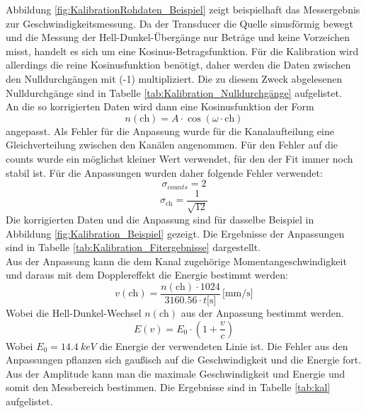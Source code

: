 \documentclass[12pt,a4paper]{article}
\begin{document}
Abbildung \ref{fig:KalibrationRohdaten_Beispiel} zeigt beispielhaft das Messergebnis zur Geschwindigkeitsmessung. Da der Transducer die Quelle sinusförmig bewegt und die Messung der Hell-Dunkel-Übergänge nur Beträge und keine Vorzeichen misst, handelt es sich um eine Kosinus-Betragsfunktion. Für die Kalibration wird allerdings die reine Kosinusfunktion benötigt, daher werden die Daten zwischen den Nulldurchgängen mit (-1) multipliziert. Die zu diesem Zweck abgelesenen Nulldurchgänge sind in Tabelle \ref{tab:Kalibration_Nulldurchgänge} aufgelistet. \\
An die so korrigierten Daten wird dann eine Kosinusfunktion der Form
\begin{equation*}
n(\textrm{ch}) = A \cdot \cos (\omega \cdot \textrm{ch})
\end{equation*}
angepasst. Als Fehler für die Anpassung wurde für die Kanalaufteilung eine Gleichverteilung zwischen den Kanälen angenommen. Für den Fehler auf die counts wurde ein möglichst kleiner Wert verwendet, für den der Fit immer noch stabil ist. Für die Anpassungen wurden daher folgende Fehler verwendet:
\begin{equation*}
\sigma _{counts} = 2
\end{equation*}
\begin{equation*}
\sigma _\textrm{ch} = \dfrac{1}{\sqrt{12}}
\end{equation*}
Die korrigierten Daten und die Anpassung sind für dasselbe Beispiel in Abbildung \ref{fig:Kalibration_Beispiel} gezeigt. Die Ergebnisse der Anpassungen sind in Tabelle \ref{tab:Kalibration_Fitergebnisse} dargestellt. \\
Aus der Anpassung kann die dem Kanal zugehörige Momentangeschwindigkeit und daraus mit dem Dopplereffekt die Energie bestimmt werden:
\begin{equation*}
v(\textrm{ch}) = \dfrac{n(\textrm{ch}) \cdot 1024}{3160.56 \cdot t \textrm{[s]}} \, \textrm{[mm/s]}
\end{equation*}
Wobei die Hell-Dunkel-Wechsel $n(\textrm{ch})$ aus der Anpassung bestimmt werden.
\begin{equation*}
E(v) = E_0 \cdot \left(1 + \dfrac{v}{c}\right)
\end{equation*}
Wobei $E_0 = \SI{14,4}{keV}$ die Energie der verwendeten Linie ist. Die Fehler aus den Anpassungen pflanzen sich gaußisch auf die Geschwindigkeit und die Energie fort.\\
Aus der Amplitude kann man die maximale Geschwindigkeit und Energie und somit den Messbereich bestimmen. Die Ergebnisse sind in Tabelle \ref{tab:kal} aufgelistet.
\end{document}
